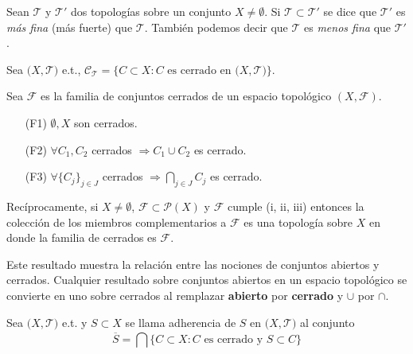 \begin{defn}
  Sean $\mathcal{T}$ y $\mathcal{T'}$ dos topologías sobre un conjunto $X \neq \emptyset$. Si $\mathcal{T} \subset \mathcal{T'}$ se dice que $\mathcal{T'}$ es \textit{ más fina } (más fuerte) que $\mathcal{T}$. También podemos decir que $\mathcal{T}$ es \textit{menos fina} que $\mathcal{T'}$.
\end{defn}

\begin{nota}
  Sea $\big( X, \mathcal{T} \big)$ e.t., $\mathcal{C}_{\mathcal{T}} = \{ C \subset X : C \text{ es cerrado en } \big( X, \mathcal{T} \big) \}$.
\end{nota}

\begin{prop}
  Sea $\mathcal{F}$ es la familia de conjuntos cerrados de un espacio topológico $( X, \mathcal{F} )$.
  \begin{enumerate}[label=(\roman*)]
    \item [(F1)] $\emptyset, X$ son cerrados.
    \item [(F2)] $\forall C_{1},C_{2}$ cerrados $ \Rightarrow C_{1} \cup C_{2}$ es cerrado.
    \item [(F3)] $\forall \{ C_{j} \}_{j \in J}$ cerrados $\Rightarrow \bigcap_{j \in J}^{} C_{j}$ es cerrado.
  \end{enumerate}
  
  Recíprocamente, si $X \neq \emptyset$, $\mathcal{F} \subset \mathcal{P}(X)$ y $\mathcal{F}$ cumple (i, ii, iii) entonces la colección de los miembros complementarios a $\mathcal{F}$ es una topología sobre $X$ en donde la familia de cerrados es $\mathcal{F}$.
\end{prop}

\begin{obs}
  Este resultado muestra la relación entre las nociones de conjuntos abiertos y cerrados. Cualquier resultado sobre conjuntos abiertos en un espacio topológico se convierte en uno sobre cerrados al remplazar \textbf{abierto} por \textbf{cerrado} y $\cup$ por $\cap$.
\end{obs}

\begin{defn}[Adherencia]
  Sea $\big( X, \mathcal{T} \big)$ e.t. y $S \subset X$ se llama adherencia de $S$ en $\big( X, \mathcal{T} \big)$ al conjunto \[ \overline{S} = \bigcap_{}^{} \{ C \subset X : C \text{ es cerrado y } S \subset C \} \] 
\end{defn}

